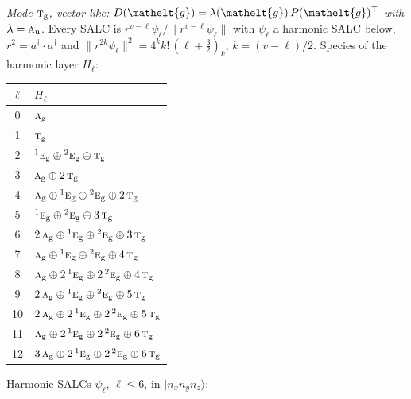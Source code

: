 \documentclass[11pt]{article}
\newcommand{\eltfont}[1]{{\let\sigma\eltsigma\mathelt{#1}}}
\newcommand{\irr}[1]{\text{\normalfont\scshape #1}}
\newcommand{\conjpair}[1]{{}^{#1}}
\newcommand{\elt}[1]{\eltfont{#1}}
\newcommand{\ptag}[1]{\mathrm{#1}}
\newcommand{\occ}[1]{\lvert #1\rangle}
\newcommand{\gel}{\elt{g}}             %
\newcommand{\gmat}{P(\gel)^{\top}}     %
\begin{document}
\emph{Mode $\irr{t}_{\ptag{g}}$, vector-like: $D(\gel)=\lambda(\gel)\,\gmat$ with $\lambda=\irr{a}_{\ptag{u}}$.} Every SALC is $r^{v-\ell}\psi_\ell/\lVert r^{v-\ell}\psi_\ell\rVert$ with $\psi_\ell$ a harmonic SALC below, $r^2=a^\dagger\!\cdot a^\dagger$ and $\lVert r^{2k}\psi_\ell\rVert^2=4^kk!\,(\ell+\tfrac32)_k$, $k=(v-\ell)/2$. Species of the harmonic layer $H_\ell$:
\begin{longtable}{c l}\hline $\ell$ & $H_\ell$\\ \hline\endhead
0 & $\irr{a}_{\ptag{g}}$\\
1 & $\irr{t}_{\ptag{g}}$\\
2 & $\conjpair{1}\irr{e}_{\ptag{g}}\oplus \conjpair{2}\irr{e}_{\ptag{g}}\oplus \irr{t}_{\ptag{g}}$\\
3 & $\irr{a}_{\ptag{g}}\oplus 2\,\irr{t}_{\ptag{g}}$\\
4 & $\irr{a}_{\ptag{g}}\oplus \conjpair{1}\irr{e}_{\ptag{g}}\oplus \conjpair{2}\irr{e}_{\ptag{g}}\oplus 2\,\irr{t}_{\ptag{g}}$\\
5 & $\conjpair{1}\irr{e}_{\ptag{g}}\oplus \conjpair{2}\irr{e}_{\ptag{g}}\oplus 3\,\irr{t}_{\ptag{g}}$\\
6 & $2\,\irr{a}_{\ptag{g}}\oplus \conjpair{1}\irr{e}_{\ptag{g}}\oplus \conjpair{2}\irr{e}_{\ptag{g}}\oplus 3\,\irr{t}_{\ptag{g}}$\\
7 & $\irr{a}_{\ptag{g}}\oplus \conjpair{1}\irr{e}_{\ptag{g}}\oplus \conjpair{2}\irr{e}_{\ptag{g}}\oplus 4\,\irr{t}_{\ptag{g}}$\\
8 & $\irr{a}_{\ptag{g}}\oplus 2\,\conjpair{1}\irr{e}_{\ptag{g}}\oplus 2\,\conjpair{2}\irr{e}_{\ptag{g}}\oplus 4\,\irr{t}_{\ptag{g}}$\\
9 & $2\,\irr{a}_{\ptag{g}}\oplus \conjpair{1}\irr{e}_{\ptag{g}}\oplus \conjpair{2}\irr{e}_{\ptag{g}}\oplus 5\,\irr{t}_{\ptag{g}}$\\
10 & $2\,\irr{a}_{\ptag{g}}\oplus 2\,\conjpair{1}\irr{e}_{\ptag{g}}\oplus 2\,\conjpair{2}\irr{e}_{\ptag{g}}\oplus 5\,\irr{t}_{\ptag{g}}$\\
11 & $\irr{a}_{\ptag{g}}\oplus 2\,\conjpair{1}\irr{e}_{\ptag{g}}\oplus 2\,\conjpair{2}\irr{e}_{\ptag{g}}\oplus 6\,\irr{t}_{\ptag{g}}$\\
12 & $3\,\irr{a}_{\ptag{g}}\oplus 2\,\conjpair{1}\irr{e}_{\ptag{g}}\oplus 2\,\conjpair{2}\irr{e}_{\ptag{g}}\oplus 6\,\irr{t}_{\ptag{g}}$\\
\hline\end{longtable}
Harmonic SALCs $\psi_\ell$, $\ell\le6$, in $\occ{n_xn_yn_z}$:
\end{document}
